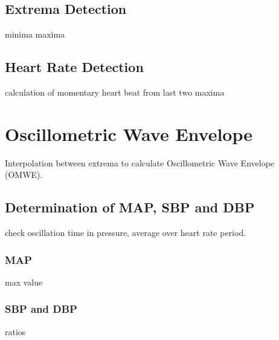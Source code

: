 \subsection{Extrema Detection}
minima
maxima

\subsection{Heart Rate Detection}
calculation of momentary heart beat from last two maxima



\section{Oscillometric Wave Envelope}
Interpolation between extrema to calculate Oscillometric Wave Envelope (OMWE).

\subsection{Determination of MAP, SBP and DBP}
check oscillation time in pressure, average over heart rate period.
\subsubsection{MAP}
max value
\subsubsection{SBP and DBP}
ratios
